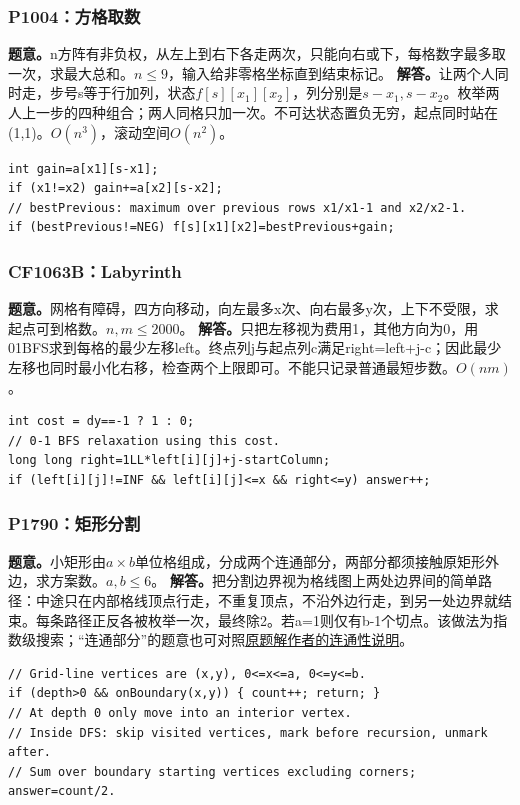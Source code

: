 \subsubsection{P1004：方格取数}
\textbf{题意。}n方阵有非负权，从左上到右下各走两次，只能向右或下，每格数字最多取一次，求最大总和。$n\le9$，输入给非零格坐标直到结束标记。
\textbf{解答。}让两个人同时走，步号s等于行加列，状态$f[s][x_1][x_2]$，列分别是$s-x_1,s-x_2$。枚举两人上一步的四种组合；两人同格只加一次。不可达状态置负无穷，起点同时站在(1,1)。$O(n^3)$，滚动空间$O(n^2)$。
\begin{lstlisting}
int gain=a[x1][s-x1];
if (x1!=x2) gain+=a[x2][s-x2];
// bestPrevious: maximum over previous rows x1/x1-1 and x2/x2-1.
if (bestPrevious!=NEG) f[s][x1][x2]=bestPrevious+gain;
\end{lstlisting}

\subsubsection{CF1063B：Labyrinth}
\textbf{题意。}网格有障碍，四方向移动，向左最多x次、向右最多y次，上下不受限，求起点可到格数。$n,m\le2000$。
\textbf{解答。}只把左移视为费用1，其他方向为0，用01BFS求到每格的最少左移left。终点列j与起点列c满足right=left+j-c；因此最少左移也同时最小化右移，检查两个上限即可。不能只记录普通最短步数。$O(nm)$。
\begin{lstlisting}
int cost = dy==-1 ? 1 : 0;
// 0-1 BFS relaxation using this cost.
long long right=1LL*left[i][j]+j-startColumn;
if (left[i][j]!=INF && left[i][j]<=x && right<=y) answer++;
\end{lstlisting}

\subsubsection{P1790：矩形分割}
\textbf{题意。}小矩形由$a\times b$单位格组成，分成两个连通部分，两部分都须接触原矩形外边，求方案数。$a,b\le6$。
\textbf{解答。}把分割边界视为格线图上两处边界间的简单路径：中途只在内部格线顶点行走，不重复顶点，不沿外边行走，到另一处边界就结束。每条路径正反各被枚举一次，最终除2。若a=1则仅有b-1个切点。该做法为指数级搜索；“连通部分”的题意也可对照\href{https://www.luogu.com.cn/article/z7wvfqyz}{原题解作者的连通性说明}。
\begin{lstlisting}
// Grid-line vertices are (x,y), 0<=x<=a, 0<=y<=b.
if (depth>0 && onBoundary(x,y)) { count++; return; }
// At depth 0 only move into an interior vertex.
// Inside DFS: skip visited vertices, mark before recursion, unmark after.
// Sum over boundary starting vertices excluding corners; answer=count/2.
\end{lstlisting}

